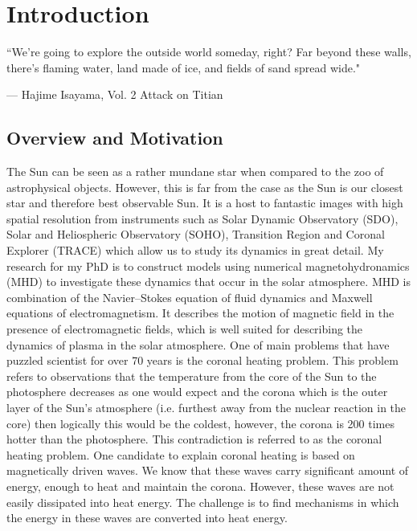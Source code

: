 \documentclass[12pt]{ociamthesis}
\newcommand{\np}{\\ \\}
\begin{document}
\chapter{Introduction}
\label{chap:intro}
\epigraph{``We're going to explore the outside world someday, right? Far beyond these walls, there's flaming water, land made of ice, and fields of sand spread wide."}{--- \textup{Hajime Isayama}, Vol. 2  Attack on Titian}
\section{Overview and Motivation}
\label{sec:overview}
The Sun can be seen as a rather mundane star when compared to the zoo of astrophysical objects. However, this is far from the case as the Sun is our closest star and therefore best observable Sun. It is a host to fantastic images with high spatial resolution from instruments such as Solar Dynamic Observatory (SDO), Solar and Heliospheric Observatory (SOHO), Transition Region and Coronal Explorer (TRACE) which allow us to study its dynamics in great detail. My research for my PhD is to construct models using numerical magnetohydronamics (MHD) to investigate these dynamics that occur in the solar atmosphere. MHD is combination of the Navier$–$Stokes equation of fluid dynamics and Maxwell equations of electromagnetism. It describes the motion of magnetic field in the presence of electromagnetic fields, which is well suited for describing the dynamics of plasma in the solar atmosphere. One of main problems that have puzzled scientist for over 70 years is the coronal heating problem. This problem refers to observations that the temperature from the core of the Sun to the photosphere decreases as one would expect and the corona which is the outer layer of the Sun's atmosphere (i.e. furthest away from the nuclear reaction in the core) then logically this would be the coldest, however, the corona is 200 times hotter than the photosphere. This contradiction is referred to as the coronal heating problem. One candidate to explain coronal heating is based on magnetically driven waves. We know that these waves carry significant amount of energy, enough to heat and maintain the corona. However, these waves are not easily dissipated into heat energy. The challenge is to find mechanisms in which the energy in these waves are converted into heat energy.  \np
\end{document}
